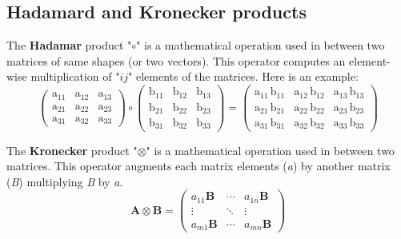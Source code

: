 \begin{appendices}
	\chapter{Hadamard and Kronecker products}
	\label{sec:hadamar_product}
		The \textbf{Hadamar} product "$\circ$" is a mathematical operation used in between two matrices of same shapes (or two vectors). This operator computes an element-wise multiplication of "$ij$" elements of the matrices. Here is an example: 
		$$
		\left(\begin{array}{ccc} \mathrm{a}_{11} & \mathrm{a}_{12} & \mathrm{a}_{13}\\ \mathrm{a}_{21} & \mathrm{a}_{22} & \mathrm{a}_{23}\\ \mathrm{a}_{31} & \mathrm{a}_{32} & \mathrm{a}_{33} \end{array}\right) \circ 
		\left(\begin{array}{ccc} \mathrm{b}_{11} & \mathrm{b}_{12} & \mathrm{b}_{13}\\ \mathrm{b}_{21} & \mathrm{b}_{22} & \mathrm{b}_{23}\\ \mathrm{b}_{31} & \mathrm{b}_{32} & \mathrm{b}_{33} \end{array}\right) = 
		\left(\begin{array}{ccc} \mathrm{a}_{11}\, \mathrm{b}_{11} & \mathrm{a}_{12}\, \mathrm{b}_{12} & \mathrm{a}_{13}\, \mathrm{b}_{13}\\ \mathrm{a}_{21}\, \mathrm{b}_{21} & \mathrm{a}_{22}\, \mathrm{b}_{22} & \mathrm{a}_{23}\, \mathrm{b}_{23}\\ \mathrm{a}_{31}\, \mathrm{b}_{31} & \mathrm{a}_{32}\, \mathrm{b}_{32} & \mathrm{a}_{33}\, \mathrm{b}_{33} \end{array}\right)
		$$

		The \textbf{Kronecker} product "$\otimes$" is a mathematical operation used in between two matrices. This operator augments each matrix elements (\textit{a}) by another matrix (\textit{B}) multiplying \textit{B} by \textit{a}.
		$$ 
		\mathbf{A}\otimes\mathbf{B} = \left( \begin{matrix} a_{11} \mathbf{B} & \cdots & a_{1n}\mathbf{B} \\ \vdots & \ddots & \vdots \\ a_{m1} \mathbf{B} & \cdots & a_{mn} \mathbf{B} \end{matrix}\right)
		$$




\end{appendices}
